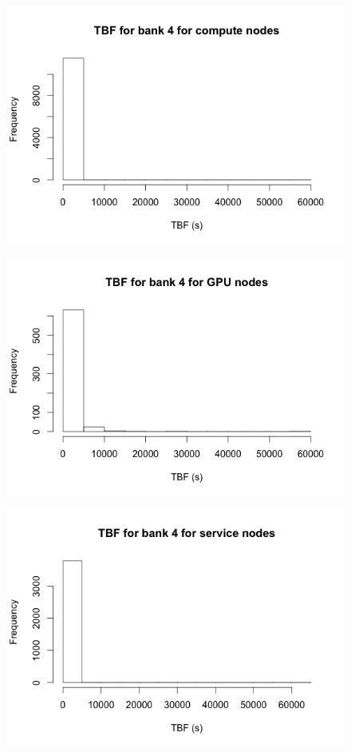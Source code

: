\begin{figure}[h]
\centering
\includegraphics{images/tbf_4_c.png}
\end{figure}

\begin{figure}[h]
\centering
\includegraphics{images/tbf_4_g.png}
\end{figure}

\begin{figure}[h]
\centering
\includegraphics{images/tbf_4_s.png}
\end{figure}

